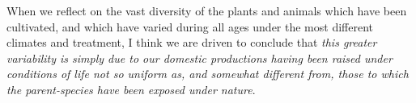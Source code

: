 When we reflect on the vast diversity of the plants and animals which have been cultivated, and which have varied during all ages under the most different climates and treatment, I think we are driven to conclude that \textit{this greater variability is simply due to our domestic productions having been raised under conditions of life not so uniform as, and somewhat different from, those to which the parent-species have been exposed under nature}. {\\}